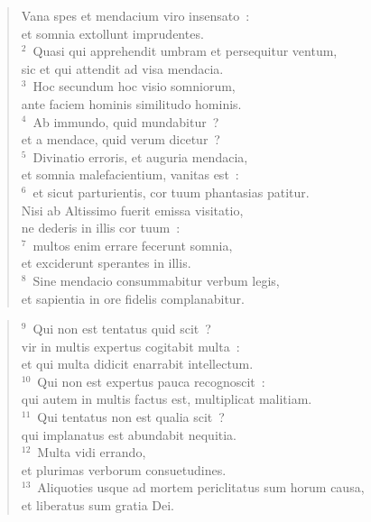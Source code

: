 \begin{flushleft}\begin{verse}\vspace{-19pt}\hspace{6pt}Vana spes et mendacium viro insensato~:\\\hspace{6pt} et somnia extollunt imprudentes.\\
${}^{2}$~Quasi qui apprehendit umbram et persequitur ventum,\\ sic et qui attendit ad visa mendacia.\\
${}^{3}$~Hoc secundum hoc visio somniorum,\\ ante faciem hominis similitudo hominis.\\
${}^{4}$~Ab immundo, quid mundabitur~?\\ et a mendace, quid verum dicetur~?\\
${}^{5}$~Divinatio erroris, et auguria mendacia,\\ et somnia malefacientium, vanitas est~:\\
${}^{6}$~et sicut parturientis, cor tuum phantasias patitur.\\ Nisi ab Altissimo fuerit emissa visitatio,\\ ne dederis in illis cor tuum~:\\
${}^{7}$~multos enim errare fecerunt somnia,\\ et exciderunt sperantes in illis.\\
${}^{8}$~Sine mendacio consummabitur verbum legis,\\ et sapientia in ore fidelis complanabitur.\end{verse}\end{flushleft}


\begin{flushleft}\begin{verse}${}^{9}$~Qui non est tentatus quid scit~?\\ vir in multis expertus cogitabit multa~:\\ et qui multa didicit enarrabit intellectum.\\
${}^{10}$~Qui non est expertus pauca recognoscit~:\\ qui autem in multis factus est, multiplicat malitiam.\\
${}^{11}$~Qui tentatus non est qualia scit~?\\ qui implanatus est abundabit nequitia.\\
${}^{12}$~Multa vidi errando,\\ et plurimas verborum consuetudines.\\
${}^{13}$~Aliquoties usque ad mortem periclitatus sum horum causa,\\ et liberatus sum gratia Dei.\end{verse}\end{flushleft}


